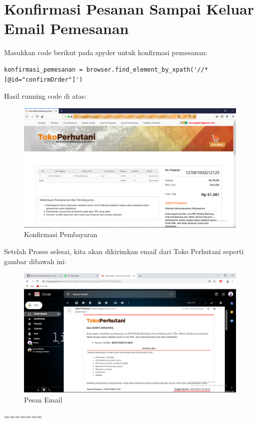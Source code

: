 \newpage
\section{Konfirmasi Pesanan Sampai Keluar Email Pemesanan}
Masukkan code berikut pada spyder untuk konfirmasi pemesanan:
\begin{verbatim}
konfirmasi_pemesanan = browser.find_element_by_xpath('//*
[@id="confirmOrder"]')
\end{verbatim}
Hasil running code di atas: 
\begin{figure}[h]
	\centering
	\includegraphics[scale=0.20]{figures/61}
	\caption{Konfirmasi Pembayaran}
\end{figure}


Setelah Proses selesai, kita akan dikirimkan email dari Toko Perhutani seperti gambar dibawah ini:
\begin{figure}[h]
	\centering
	\includegraphics[scale=0.20]{figures/62}
	\caption{Pesan Email}
\end{figure}
=======
